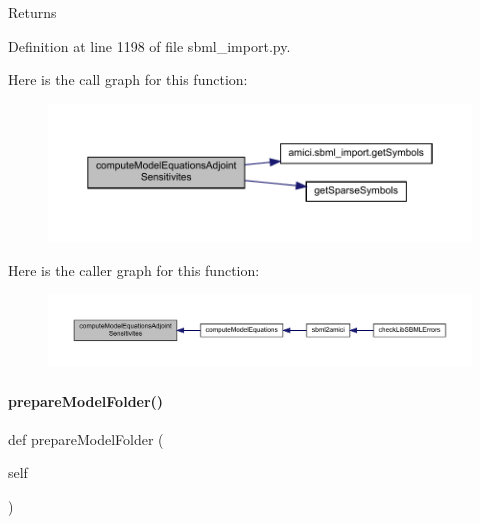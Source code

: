 \begin{DoxyReturn}{Returns}

\end{DoxyReturn}


Definition at line 1198 of file sbml\+\_\+import.\+py.

Here is the call graph for this function\+:
\nopagebreak
\begin{figure}[H]
\begin{center}
\leavevmode
\includegraphics[width=350pt]{classamici_1_1sbml__import_1_1_sbml_importer_a3a4c18dff314f187d61553ee60a7c45e_cgraph}
\end{center}
\end{figure}
Here is the caller graph for this function\+:
\nopagebreak
\begin{figure}[H]
\begin{center}
\leavevmode
\includegraphics[width=350pt]{classamici_1_1sbml__import_1_1_sbml_importer_a3a4c18dff314f187d61553ee60a7c45e_icgraph}
\end{center}
\end{figure}
\mbox{\label{classamici_1_1sbml__import_1_1_sbml_importer_a39c6b169618d16df62686f18aa92db75}} 
\paragraph{\texorpdfstring{prepare\+Model\+Folder()}{prepareModelFolder()}}
{\footnotesize\ttfamily def prepare\+Model\+Folder (\begin{DoxyParamCaption}\item[{}]{self }\end{DoxyParamCaption})}

